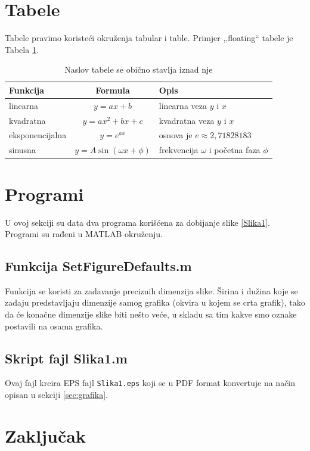 \documentclass[12pt]{SeminarskiADS}
\begin{document}
\section{Tabele}

Tabele pravimo koristeći okruženja tabular i table.
Primjer ,,floating`` tabele je Tabela \ref{tab:1}.
\begin{table}[tbh]
\caption{Naslov tabele se obično stavlja iznad nje}
\label{tab:1}
\centering
\begin{tabular}{lcl}
\toprule
Funkcija & Formula & Opis \\ 
\midrule 
linearna & $y=ax+b$ & linearna veza $y$ i $x$ \\ 
kvadratna & $y=ax^2+bx+c$ & kvadratna veza $y$ i $x$ \\ 
eksponencijalna & $y=e^{ax}$ & osnova je $e\approx 2,71828183$\\ 
sinusna & $y=A\sin(\omega x+\phi)$ & frekvencija $\omega$ i početna faza $\phi$\\ 
\bottomrule
\end{tabular} 
\end{table}


\section{Programi}

U ovoj sekciji su data dva programa korišćena za dobijanje slike \ref{Slika1}. Programi su rađeni u MATLAB okruženju.

\subsection{Funkcija SetFigureDefaults.m}
Funkcija se koristi za zadavanje preciznih dimenzija slike. Širina i dužina koje se zadaju predstavljaju dimenzije samog grafika (okvira u kojem se crta grafik), tako da će konačne dimenzije slike biti nešto veće, u skladu sa tim kakve smo oznake postavili na osama grafika.


\subsection{Skript fajl Slika1.m}
Ovaj fajl kreira EPS fajl \texttt{Slika1.eps} koji se u PDF format konvertuje na način opisan u sekciji \ref{sec:grafika}.



\section*{Zaključak}
\end{document}
